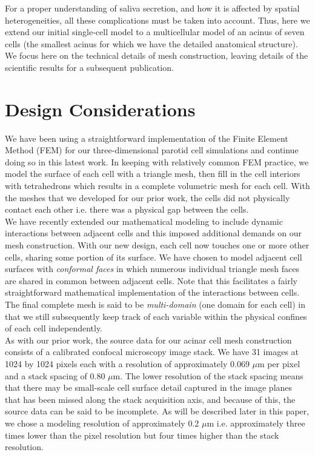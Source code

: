 \documentclass[a4paper,10pt]{article}
\begin{document}
For a proper understanding of saliva secretion, and how it is affected by spatial heterogeneities, all these complications must be taken into account. Thus, here we extend our initial single-cell model to a multicellular model of an acinus of seven cells (the smallest acinus for which we have the detailed anatomical structure).
We focus here on the technical details of mesh construction, leaving details of the scientific results for a subsequent publication.\\

\section{Design Considerations} 
We have been using a straightforward implementation of the Finite Element Method (FEM) \cite{gockenbach2006understanding,Hughes2000,gosz2005finite} for our three-dimensional parotid cell simulations and continue doing so in this latest work. In keeping with relatively common FEM practice, we model the surface of each cell with a triangle mesh, then fill in the cell interiors with tetrahedrons which results in a complete volumetric mesh for each cell. With the meshes that we developed for our prior work, the cells did not physically contact each other i.e. there was a physical gap between the cells.\\

We have recently extended our mathematical modeling to include dynamic interactions between adjacent cells and this imposed additional demands on our mesh construction. With our new design, each cell now touches one or more other cells, sharing some portion of its surface. We have chosen to model adjacent cell surfaces with \emph{conformal faces} in which numerous individual triangle mesh faces are shared in common between adjacent cells. Note that this facilitates a fairly straightforward mathematical implementation of the interactions between cells. The final complete mesh is said to be \emph{multi-domain} (one domain for each cell) in that we still subsequently keep track of each variable within the physical confines of each cell independently.\\

As with our prior work, the source data for our acinar cell mesh construction consists of a calibrated confocal microscopy image stack. We have 31 images at 1024 by 1024 pixels each with a resolution of approximately 0.069 $\mu$m per pixel and a stack spacing of 0.80 $\mu$m. The lower resolution of the stack spacing means that there may be small-scale cell surface detail captured in the image planes that has been missed along the stack acquisition axis, and because of this, the source data can be said to be incomplete.  As will be described later in this paper, we chose a modeling resolution of approximately 0.2 $\mu$m i.e. approximately three times lower than the pixel resolution but four times higher than the stack resolution.\\
\end{document}
